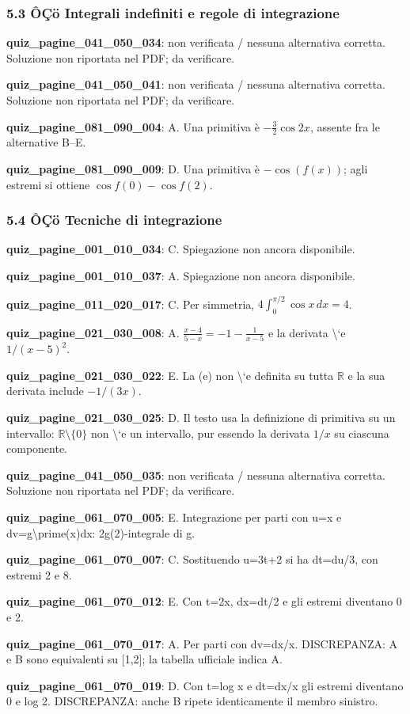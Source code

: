\documentclass[11pt,a4paper]{article}
\newcounter{quiz}
\begin{document}
\subsubsection*{5.3 ÔÇö Integrali indefiniti e regole di integrazione}
\noindent\textbf{quiz\_pagine\_041\_050\_034}: non verificata / nessuna alternativa corretta. Soluzione non riportata nel PDF; da verificare.\par\medskip
\noindent\textbf{quiz\_pagine\_041\_050\_041}: non verificata / nessuna alternativa corretta. Soluzione non riportata nel PDF; da verificare.\par\medskip
\noindent\textbf{quiz\_pagine\_081\_090\_004}: A. Una primitiva è $-\frac32\cos 2x$, assente fra le alternative B--E.\par\medskip
\noindent\textbf{quiz\_pagine\_081\_090\_009}: D. Una primitiva è $-\cos(f(x))$; agli estremi si ottiene $\cos f(0)-\cos f(2)$.\par\medskip
\subsubsection*{5.4 ÔÇö Tecniche di integrazione}
\noindent\textbf{quiz\_pagine\_001\_010\_034}: C. Spiegazione non ancora disponibile.\par\medskip
\noindent\textbf{quiz\_pagine\_001\_010\_037}: A. Spiegazione non ancora disponibile.\par\medskip
\noindent\textbf{quiz\_pagine\_011\_020\_017}: C. Per simmetria, $4\int_0^{\pi/2}\cos x\,dx=4$.\par\medskip
\noindent\textbf{quiz\_pagine\_021\_030\_008}: A. $\frac{x-4}{5-x}=-1-\frac1{x-5}$ e la derivata \textbackslash{}`e $1/(x-5)^2$.\par\medskip
\noindent\textbf{quiz\_pagine\_021\_030\_022}: E. La (e) non \textbackslash{}`e definita su tutta $\mathbb R$ e la sua derivata include $-1/(3x)$.\par\medskip
\noindent\textbf{quiz\_pagine\_021\_030\_025}: D. Il testo usa la definizione di primitiva su un intervallo: $\mathbb R\setminus\{0\}$ non \textbackslash{}`e un intervallo, pur essendo la derivata $1/x$ su ciascuna componente.\par\medskip
\noindent\textbf{quiz\_pagine\_041\_050\_035}: non verificata / nessuna alternativa corretta. Soluzione non riportata nel PDF; da verificare.\par\medskip
\noindent\textbf{quiz\_pagine\_061\_070\_005}: E. Integrazione per parti con u=x e dv=g\textbackslash{}prime(x)dx: 2g(2)-integrale di g.\par\medskip
\noindent\textbf{quiz\_pagine\_061\_070\_007}: C. Sostituendo u=3t+2 si ha dt=du/3, con estremi 2 e 8.\par\medskip
\noindent\textbf{quiz\_pagine\_061\_070\_012}: E. Con t=2x, dx=dt/2 e gli estremi diventano 0 e 2.\par\medskip
\noindent\textbf{quiz\_pagine\_061\_070\_017}: A. Per parti con dv=dx/x. DISCREPANZA: A e B sono equivalenti su [1,2]; la tabella ufficiale indica A.\par\medskip
\noindent\textbf{quiz\_pagine\_061\_070\_019}: D. Con t=log x e dt=dx/x gli estremi diventano 0 e log 2. DISCREPANZA: anche B ripete identicamente il membro sinistro.\par\medskip
\end{document}
